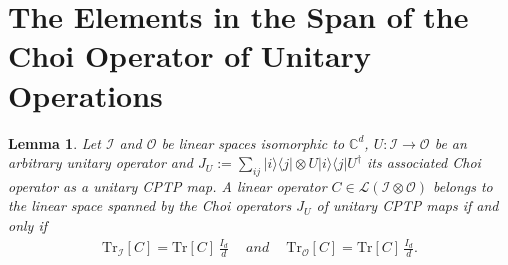 \documentclass[a4paper,twocolumn,accepted=2022-10-23]{quantumarticle}
\newcommand{\ketbra}[2]{\vert {#1} \rangle\!\langle {#2} \vert}
\newcommand{\Tr}[0]{{\mathrm{Tr}}}
\newtheorem{lem}{Lemma}
\theoremstyle{definition}
\begin{document}
\section{The Elements in the Span of the Choi Operator of Unitary Operations}\label{ap:span}

\begin{lem} \label{lem:span1}
Let $\mathcal{I}$ and $\mathcal{O}$ be linear spaces isomorphic to $\mathbb{C}^d$, $U:\mathcal{I}\to\mathcal{O}$ be an arbitrary unitary operator and ${J_U:=\sum_{ij} \ketbra{i}{j}\otimes U\ketbra{i}{j}U^\dagger}$ its associated Choi operator as a unitary CPTP map.
A linear operator $C\in \mathcal{L}(\mathcal{I}\otimes\mathcal{O})$ belongs to the linear space spanned by the Choi operators $J_U$ of unitary CPTP maps if and only if
	\begin{align} \label{Eq:unital}
		\Tr_{\mathcal{I}}[C] = \Tr[C] \, \frac{I_d}{d}~\quad and~ \quad
    \Tr_{\mathcal{O}}[C] = \Tr[C] \, \frac{I_d}{d}.
	\end{align}
\end{lem}
\end{document}
